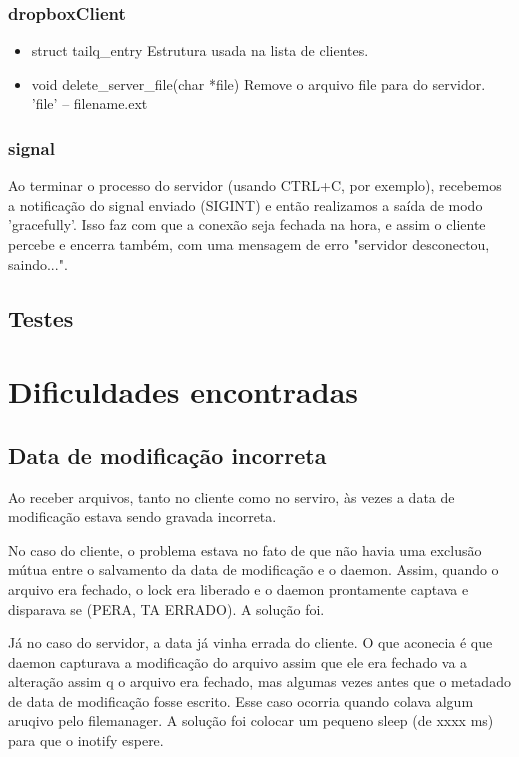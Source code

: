 \documentclass[a4paper]{article}
\begin{document}
\subsubsection{dropboxClient}
\begin{itemize}
	\item struct tailq\_entry
	\newline Estrutura usada na lista de clientes.
	
	\item void delete\_server\_file(char *file)
	\newline Remove o arquivo file para do servidor. 'file' – filename.ext
\end{itemize}

\subsubsection{signal}
Ao terminar o processo do servidor (usando CTRL+C, por exemplo), recebemos a notificação do signal enviado (SIGINT) e então realizamos a saída de modo 'gracefully'. Isso faz com que a conexão seja fechada na hora, e assim o cliente percebe e encerra também, com uma mensagem de erro "servidor desconectou, saindo...".

\subsection{Testes}

\section{Dificuldades encontradas}

\subsection{Data de modificação incorreta}
Ao receber arquivos, tanto no cliente como no serviro, às vezes a data de modificação estava sendo gravada incorreta.

No caso do cliente, o problema estava no fato de que não havia uma exclusão mútua entre o salvamento da data de modificação e o daemon. Assim, quando o arquivo era fechado, o lock era liberado e o daemon prontamente captava e disparava se (PERA, TA ERRADO). A solução foi.

Já no caso do servidor, a data já vinha errada do cliente. O que aconecia é que daemon capturava a modificação do arquivo assim que ele era fechado
va a alteração assim q o arquivo era fechado, mas algumas vezes antes que o metadado de data de modificação fosse escrito. Esse caso ocorria quando colava algum aruqivo pelo filemanager. A solução foi colocar um pequeno sleep (de xxxx ms) para que o inotify espere.
\end{document}
